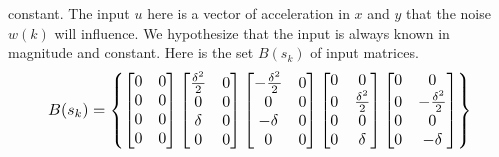 \documentclass[twocolumn]{article}
\begin{document}
constant. The input $u$ here is a vector of acceleration in $x$ and $y$ that the noise $w(k)$ will influence.
We hypothesize that the input is always known in magnitude and constant. Here is the set $B(s_{k})$ of input matrices.
\begin{equation*}%
    \resizebox{.9 \columnwidth}{!}{
        $B(s_{k})=\begin{Bmatrix}
                \begin{bmatrix}
                    0 & 0 \\
                    0 & 0 \\
                    0 & 0 \\
                    0 & 0 \\
                \end{bmatrix}
                \begin{bmatrix}
                    \frac{\delta^{2}}{2} & 0 \\
                    0                    & 0 \\
                    \delta               & 0 \\
                    0                    & 0 \\
                \end{bmatrix}
                \begin{bmatrix}
                    -\frac{\delta^{2}}{2} & 0 \\
                    0                     & 0 \\
                    -\delta               & 0 \\
                    0                     & 0 \\
                \end{bmatrix}
                \begin{bmatrix}
                    0 & 0                    \\
                    0 & \frac{\delta^{2}}{2} \\
                    0 & 0                    \\
                    0 & \delta               \\
                \end{bmatrix}
                \begin{bmatrix}
                    0 & 0                     \\
                    0 & -\frac{\delta^{2}}{2} \\
                    0 & 0                     \\
                    0 & -\delta               \\
                \end{bmatrix}
            \end{Bmatrix} $
    }
\end{equation*}
\end{document}
